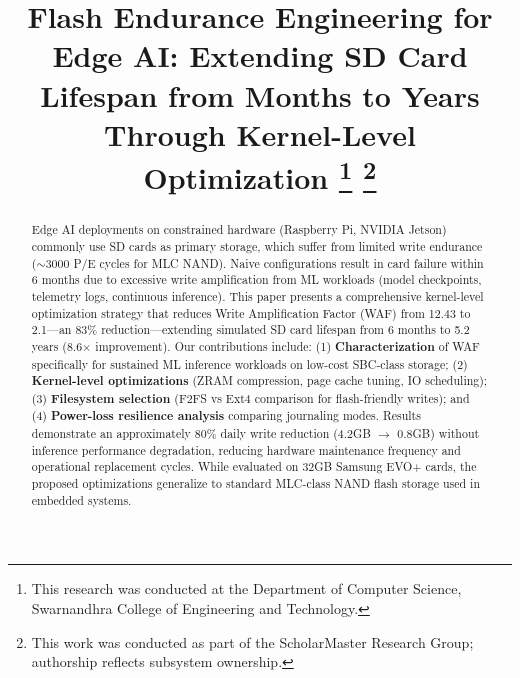 \documentclass[conference]{IEEEtran}
\begin{document}
\title{Flash Endurance Engineering for Edge AI: Extending SD Card Lifespan from Months to Years Through Kernel-Level Optimization
\thanks{This research was conducted at the Department of Computer Science, Swarnandhra College of Engineering and Technology.}
\thanks{This work was conducted as part of the ScholarMaster Research Group; authorship reflects subsystem ownership.}
}

\author{
}

\maketitle

\begin{abstract}
Edge AI deployments on constrained hardware (Raspberry Pi, NVIDIA Jetson) commonly use SD cards as primary storage, which suffer from limited write endurance ($\sim$3000 P/E cycles for MLC NAND). Naive configurations result in card failure within 6 months due to excessive write amplification from ML workloads (model checkpoints, telemetry logs, continuous inference). This paper presents a comprehensive kernel-level optimization strategy that reduces Write Amplification Factor (WAF) from 12.43 to 2.1---an 83\% reduction---extending simulated SD card lifespan from 6 months to 5.2 years (8.6$\times$ improvement). Our contributions include: (1) \textbf{Characterization} of WAF specifically for sustained ML inference workloads on low-cost SBC-class storage; (2) \textbf{Kernel-level optimizations} (ZRAM compression, page cache tuning, IO scheduling); (3) \textbf{Filesystem selection} (F2FS vs Ext4 comparison for flash-friendly writes); and (4) \textbf{Power-loss resilience analysis} comparing journaling modes. Results demonstrate an approximately 80\% daily write reduction (4.2GB $\to$ 0.8GB) without inference performance degradation, reducing hardware maintenance frequency and operational replacement cycles. While evaluated on 32GB Samsung EVO+ cards, the proposed optimizations generalize to standard MLC-class NAND flash storage used in embedded systems.
\end{abstract}
\end{document}
